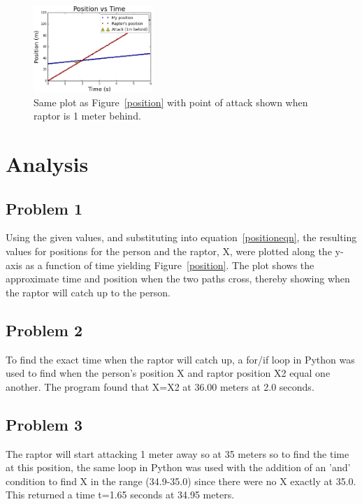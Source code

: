 \documentclass[twocolumn]{revtex4}
\begin{document}
\begin{figure}          		
\includegraphics[width=0.40\textwidth]{attackplot.png}        
\caption{Same plot as Figure~\ref{position} with point of attack shown when raptor is 1 meter behind.}
\label{attack}

\end{figure}
\section{Analysis}
\subsection{Problem 1}
Using the given values, and substituting into equation~\ref{positioneqn}, the resulting values for positions for the person and the raptor, X, were plotted along the y-axis as a function of time yielding Figure~\ref{position}. The plot shows the approximate time and position when the two paths cross, thereby showing when the raptor will catch up to the person. 
\subsection{Problem 2}
To find the exact time when the raptor will catch up, a for/if loop in Python was used to find when the person's position X and raptor position X2 equal one another. The program found that X=X2 at 36.00 meters at 2.0 seconds. 
\subsection{Problem 3}
The raptor will start attacking 1 meter away so at 35 meters so to find the time at this position, the same loop in Python was used with the addition of an 'and' condition to find X in the range (34.9-35.0) since there were no X exactly at 35.0. This returned a time t=1.65 seconds at 34.95 meters.
\end{document}
